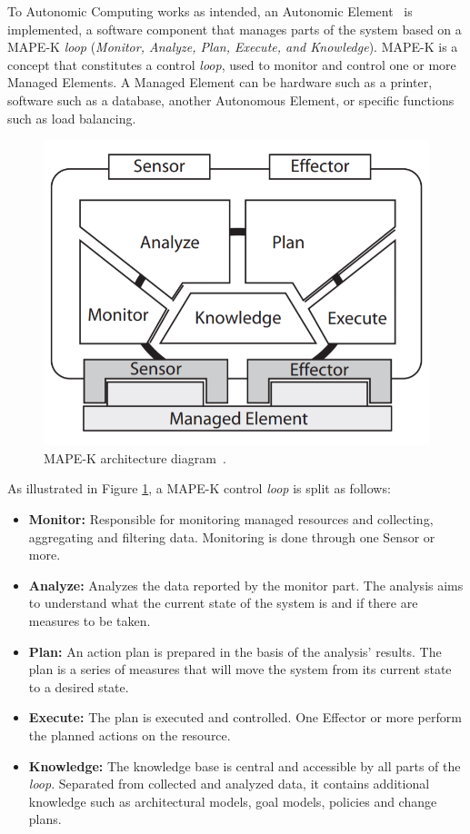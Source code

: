 \documentclass[sigconf]{acmart}
\begin{document}
To Autonomic Computing works as intended, an Autonomic Element~\citep{Abbas_2010} is implemented, a software component that manages parts of the system based on a MAPE-K \textit{loop} (\textit{Monitor, Analyze, Plan, Execute, and Knowledge}). MAPE-K is a concept that constitutes a control \textit{loop}, used to monitor and control one or more Managed Elements. A Managed Element can be hardware such as a printer, software such as a database, another Autonomous Element, or specific functions such as load balancing. 

\begin{figure}[H]
\centering
\includegraphics[scale=0.5]{images/MAPE-K.png}
\caption {MAPE-K architecture diagram~\citep{Abbas_2010}.}
\label{fig:MAPEK}
\end{figure}

As illustrated in Figure \ref{fig:MAPEK}, a MAPE-K control \textit{loop} is split as follows:

\begin{itemize}
\item \textbf{Monitor:} Responsible for monitoring managed resources and collecting, aggregating and filtering data. Monitoring is done through one Sensor or more.
\item \textbf{Analyze:} Analyzes the data reported by the monitor part. The analysis aims to understand what the current state of the system is and if there are measures to be taken.
\item \textbf{Plan:} An action plan is prepared in the basis of the analysis' results. The plan is a series of measures that will move the system from its current state to a desired state.
\item \textbf{Execute:} The plan is executed and controlled. One Effector or more perform the planned actions on the resource.
\item \textbf{Knowledge:} The knowledge base is central and accessible by all parts of the \textit{loop}. Separated from collected and analyzed data, it contains additional knowledge such as architectural models, goal models, policies and change plans.
\end{itemize}
\end{document}
